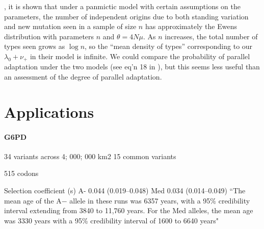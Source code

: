 \documentclass{article}
\begin{document}

\citet{softsweepsII}, it is shown that under a panmictic model with certain assumptions on the parameters,
the number of independent origins due to both standing variation and new mutation seen in a sample of size $n$
has approximately the Ewens distribution with parameters $n$ and $\theta = 4 N \mu$.
As $n$ increases, the total number of types seen grows as $\log n$, 
so the ``mean density of types'' corresponding to our $\lambda_0 + \nu_+$ in their model is infinite.
We could compare the probability of parallel adaptation under the two models (see eq'n 18 in \citet{softsweepsII}),
but this seems less useful than an assessment of the degree of parallel adaptation.


\section{Applications}



\paragraph{G6PD}
34 variants across 4; 000; 000 km2
15 common variants 

515 codons

Selection coefficient (s) 	A- 0.044 (0.019–0.048)  Med	0.034
(0.014–0.049)  ``The mean age of the A− allele in these runs was 6357 years, with a 95\% credibility interval extending from 3840 to 11,760 years. For the Med alleles, the mean age was 3330 years with a 95\% credibility interval of 1600 to 6640 years"
\citet{tishkoff-g6pd}
\end{document}
